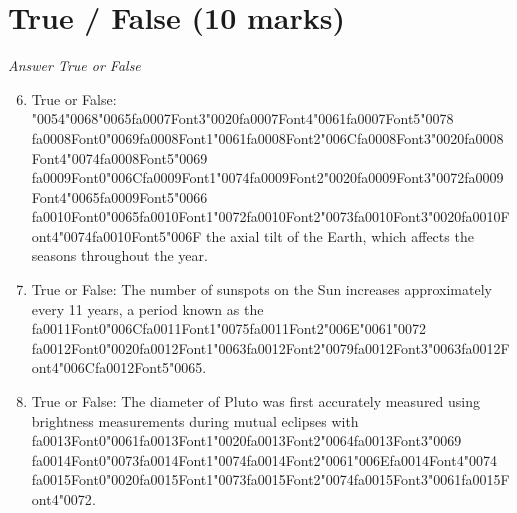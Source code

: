 \documentclass[12pt]{article}
\begin{document}
\section*{True / False (10 marks)}
\textit{Answer True or False}
\begin{enumerate}[label=\arabic*.]
\setcounter{enumi}{5}
\item True or False: {\char"0054}{\char"0068}{\char"0065}{\csname fa0007Font3\endcsname\char"0020}{\csname fa0007Font4\endcsname\char"0061}{\csname fa0007Font5\endcsname\char"0078} {\csname fa0008Font0\endcsname\char"0069}{\csname fa0008Font1\endcsname\char"0061}{\csname fa0008Font2\endcsname\char"006C}{\csname fa0008Font3\endcsname\char"0020}{\csname fa0008Font4\endcsname\char"0074}{\csname fa0008Font5\endcsname\char"0069} {\csname fa0009Font0\endcsname\char"006C}{\csname fa0009Font1\endcsname\char"0074}{\csname fa0009Font2\endcsname\char"0020}{\csname fa0009Font3\endcsname\char"0072}{\csname fa0009Font4\endcsname\char"0065}{\csname fa0009Font5\endcsname\char"0066} {\csname fa0010Font0\endcsname\char"0065}{\csname fa0010Font1\endcsname\char"0072}{\csname fa0010Font2\endcsname\char"0073}{\csname fa0010Font3\endcsname\char"0020}{\csname fa0010Font4\endcsname\char"0074}{\csname fa0010Font5\endcsname\char"006F} the axial tilt of the Earth, which affects the seasons throughout the year.
\item True or False: The number of sunspots on the Sun increases approximately every 11 years, a period known as the {\csname fa0011Font0\endcsname\char"006C}{\csname fa0011Font1\endcsname\char"0075}{\csname fa0011Font2\endcsname\char"006E}{\char"0061}{\char"0072} {\csname fa0012Font0\endcsname\char"0020}{\csname fa0012Font1\endcsname\char"0063}{\csname fa0012Font2\endcsname\char"0079}{\csname fa0012Font3\endcsname\char"0063}{\csname fa0012Font4\endcsname\char"006C}{\csname fa0012Font5\endcsname\char"0065}.
\item True or False: The diameter of Pluto was first accurately measured using brightness measurements during mutual eclipses with {\csname fa0013Font0\endcsname\char"0061}{\csname fa0013Font1\endcsname\char"0020}{\csname fa0013Font2\endcsname\char"0064}{\csname fa0013Font3\endcsname\char"0069} {\csname fa0014Font0\endcsname\char"0073}{\csname fa0014Font1\endcsname\char"0074}{\csname fa0014Font2\endcsname\char"0061}{\char"006E}{\csname fa0014Font4\endcsname\char"0074} {\csname fa0015Font0\endcsname\char"0020}{\csname fa0015Font1\endcsname\char"0073}{\csname fa0015Font2\endcsname\char"0074}{\csname fa0015Font3\endcsname\char"0061}{\csname fa0015Font4\endcsname\char"0072}.

\end{enumerate}
\end{document}
